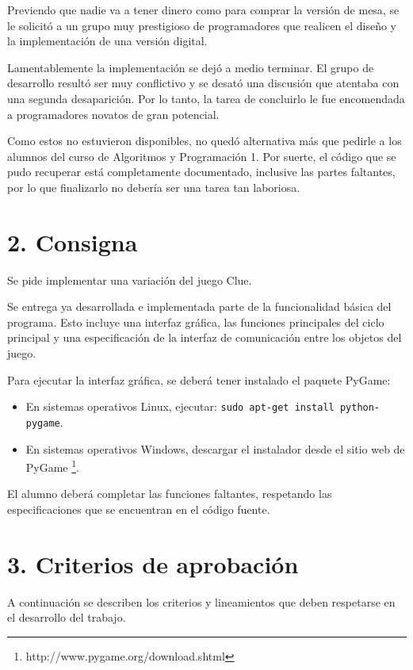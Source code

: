 \documentclass[12pt,spanish,]{article}
\begin{document}
Previendo que nadie va a tener dinero como para comprar la versión de
mesa, se le solicitó a un grupo muy prestigioso de programadores que
realicen el diseño y la implementación de una versión digital.

Lamentablemente la implementación se dejó a medio terminar. El grupo de
desarrollo resultó ser muy conflictivo y se desató una discusión que
atentaba con una segunda desaparición. Por lo tanto, la tarea de
concluirlo le fue encomendada a programadores novatos de gran potencial.

Como estos no estuvieron disponibles, no quedó alternativa más que
pedirle a los alumnos del curso de Algoritmos y Programación 1. Por
suerte, el código que se pudo recuperar está completamente documentado,
inclusive las partes faltantes, por lo que finalizarlo no debería ser
una tarea tan laboriosa.

\section{2. Consigna}\label{consigna}

Se pide implementar una variación del juego Clue.

Se entrega ya desarrollada e implementada parte de la funcionalidad
básica del programa. Esto incluye una interfaz gráfica, las funciones
principales del ciclo principal y una especificación de la interfaz de
comunicación entre los objetos del juego.

Para ejecutar la interfaz gráfica, se deberá tener instalado el paquete
PyGame:

\begin{itemize}
\itemsep1pt\parskip0pt
\item
  En sistemas operativos Linux, ejecutar:
  \texttt{sudo apt-get install python-pygame}.
\item
  En sistemas operativos Windows, descargar el instalador desde el sitio
  web de PyGame \footnote{http://www.pygame.org/download.shtml}.
\end{itemize}

El alumno deberá completar las funciones faltantes, respetando las
especificaciones que se encuentran en el código fuente.

\section{3. Criterios de aprobación}\label{criterios-de-aprobaciuxf3n}

A continuación se describen los criterios y lineamientos que deben
respetarse en el desarrollo del trabajo.
\end{document}
